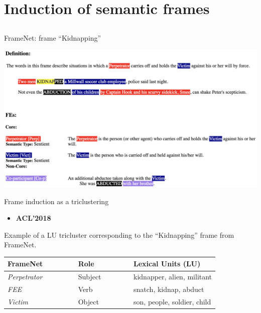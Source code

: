 \section{Induction of semantic frames}

\subsection{}

\begin{frame}{FrameNet: frame ``Kidnapping''}

\begin{center}	
\includegraphics[width=1.0\textwidth]{figures/fn-kidnap}
\end{center}

\end{frame}



\begin{frame}{Frame induction as a triclustering}

\begin{itemize}
\item \textbf{ACL'2018}~\cite{ustalov2018unsupervised}	
\end{itemize}

Example of a LU tricluster corresponding to the ``Kidnapping'' frame from FrameNet.

\begin{table}[t]
\centering
\begin{tabular}{lll}
\textbf{FrameNet~~~~~~~} & \textbf{Role~~~~~~~~} & \textbf{Lexical Units (LU)} \\\toprule
\textit{Perpetrator} & Subject & kidnapper, alien, militant \\ \midrule
\textit{FEE}         & Verb    & snatch, kidnap, abduct \\ \midrule
\textit{Victim}      & Object  & son, people, soldier, child \\
\end{tabular}

\end{table}	

\end{frame}



